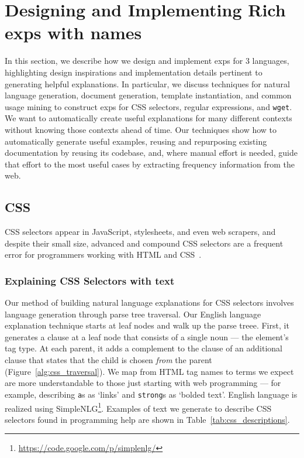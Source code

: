 \section{Designing and Implementing Rich \Glspl{exp} with \Glspl{name}}

In this section, we describe how we design and implement \glspl{exp} for 3 languages, highlighting design inspirations and implementation details pertinent to generating helpful explanations.
In particular, we discuss techniques for natural language generation, document generation, template instantiation, and common usage mining to construct \glspl{exp} for CSS selectors, regular expressions, and \texttt{wget}.
We want to automatically create useful explanations for many different contexts without knowing those contexts ahead of time. 
Our techniques show how to automatically generate useful examples, reusing and repurposing existing documentation by reusing its codebase, and, where manual effort is needed, guide that effort to the most useful cases by extracting frequency information from the web.

\subsection{CSS}

CSS selectors appear in JavaScript, stylesheets, and even web scrapers, and despite their small size, advanced and compound CSS selectors are a frequent error for programmers working with HTML and CSS~\cite{park_towards_2013}.

\subsubsection{Explaining CSS Selectors with text}

Our method of building natural language explanations for CSS selectors involves language generation through parse tree traversal.
Our English language explanation technique starts at leaf nodes and walk up the parse treee.
First, it generates a clause at a leaf node that consists of a single noun --- the element's tag type.
At each parent, it adds a complement to the clause of an additional clause that states that the child is chosen \emph{from} the parent (Figure~\ref{alg:css_traversal}).
We map from HTML tag names to terms we expect are more understandable to those just starting with web programming --- for example, describing \texttt{a}s as `links' and \texttt{strong}s as `bolded text'. 
English language is realized using SimpleNLG\footnote{\url{https://code.google.com/p/simplenlg/}}.
Examples of text we generate to describe CSS selectors found in programming help are shown in Table~\ref{tab:css_descriptions}.

